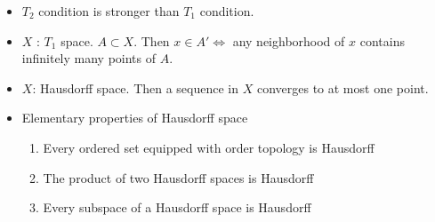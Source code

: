 \documentclass[12pt]{article}
\begin{document}
\begin{itemize}
\begin{itemize}
	\end{itemize}
	\item $T_2$ condition is stronger than $T_1$ condition. 
	\item $X$ : $T_1$ space. $A\subset X$. Then $x\in A' \Leftrightarrow $ any neighborhood of $x$ contains infinitely many points of $A$.
	\item $X$: Hausdorff space. Then a sequence in $X$ converges to at most one point. 
	\item Elementary properties of Hausdorff space
	\begin{enumerate}
		\item Every ordered set equipped with order topology is Hausdorff
		\item The product of two Hausdorff spaces is Hausdorff
		\item Every subspace of a Hausdorff space is Hausdorff 
	\end{enumerate}
\end{itemize}


\clearpage
\end{document}
